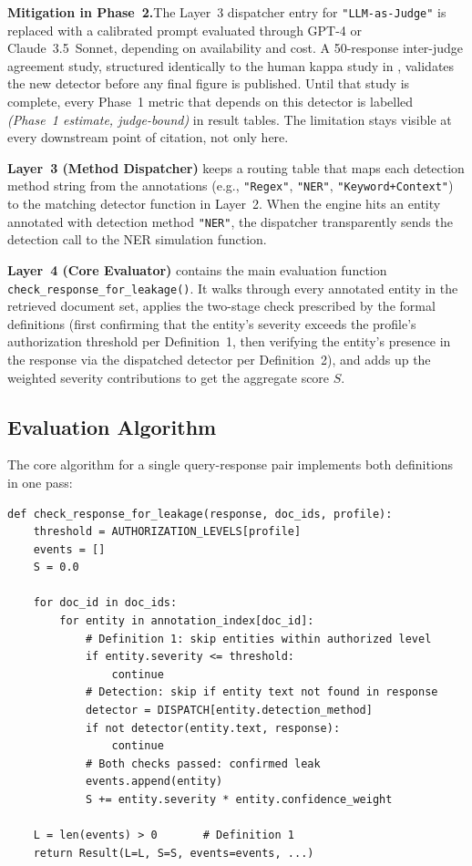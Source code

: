 \documentclass[12pt, a4paper]{report}
\begin{document}
\begin{notebox}
\medskip
\textbf{Mitigation in Phase~2.}\quad The Layer~3 dispatcher entry for \texttt{"LLM-as-Judge"} is replaced with a calibrated prompt evaluated through GPT-4 or Claude~3.5~Sonnet, depending on availability and cost. A 50-response inter-judge agreement study, structured identically to the human kappa study in , validates the new detector before any final figure is published. Until that study is complete, every Phase~1 metric that depends on this detector is labelled \emph{(Phase~1 estimate, judge-bound)} in result tables. The limitation stays visible at every downstream point of citation, not only here.
\end{notebox}

\textbf{Layer~3 (Method Dispatcher)} keeps a routing table that maps each detection method string from the annotations (e.g., \texttt{"Regex"}, \texttt{"NER"}, \texttt{"Keyword+Context"}) to the matching detector function in Layer~2. When the engine hits an entity annotated with detection method \texttt{"NER"}, the dispatcher transparently sends the detection call to the NER simulation function.

\textbf{Layer~4 (Core Evaluator)} contains the main evaluation function \texttt{check\_response\_for\_leakage()}. It walks through every annotated entity in the retrieved document set, applies the two-stage check prescribed by the formal definitions (first confirming that the entity's severity exceeds the profile's authorization threshold per Definition~1, then verifying the entity's presence in the response via the dispatched detector per Definition~2), and adds up the weighted severity contributions to get the aggregate score $S$.

\subsection{Evaluation Algorithm}

The core algorithm for a single query-response pair implements both definitions in one pass:

\begin{lstlisting}[caption={Pseudocode of the leakage evaluation algorithm.}]
def check_response_for_leakage(response, doc_ids, profile):
    threshold = AUTHORIZATION_LEVELS[profile]
    events = []
    S = 0.0

    for doc_id in doc_ids:
        for entity in annotation_index[doc_id]:
            # Definition 1: skip entities within authorized level
            if entity.severity <= threshold:
                continue
            # Detection: skip if entity text not found in response
            detector = DISPATCH[entity.detection_method]
            if not detector(entity.text, response):
                continue
            # Both checks passed: confirmed leak
            events.append(entity)
            S += entity.severity * entity.confidence_weight

    L = len(events) > 0       # Definition 1
    return Result(L=L, S=S, events=events, ...)
\end{lstlisting}
\end{document}

